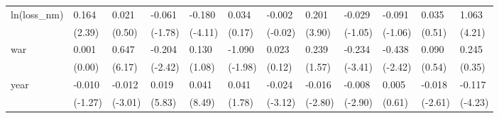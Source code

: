 \begin{tabular}{p{1.5cm} p{2cm} p{1.7cm} p{1.7cm} p{1.7cm} p{1.7cm} p{1.7cm} p{1.7cm} p{1.7cm} p{1.7cm} p{1.7cm} p{1.7cm}}
\hline
ln(loss\_nm)     &    0.164\sym{*}  &    0.021         &   -0.061         &   -0.180\sym{**} &    0.034         &   -0.002         &    0.201\sym{**} &   -0.029         &   -0.091         &    0.035         &    1.063\sym{**} \\
                &   (2.39)         &   (0.50)         &  (-1.78)         &  (-4.11)         &   (0.17)         &  (-0.02)         &   (3.90)         &  (-1.05)         &  (-1.06)         &   (0.51)         &   (4.21)         \\
war             &    0.001         &    0.647\sym{***}&   -0.204\sym{*}  &    0.130         &   -1.090         &    0.023         &    0.239         &   -0.234\sym{**} &   -0.438\sym{*}  &    0.090         &    0.245         \\
                &   (0.00)         &   (6.17)         &  (-2.42)         &   (1.08)         &  (-1.98)         &   (0.12)         &   (1.57)         &  (-3.41)         &  (-2.42)         &   (0.54)         &   (0.35)         \\
year            &   -0.010         &   -0.012\sym{**} &    0.019\sym{***}&    0.041\sym{***}&    0.041         &   -0.024\sym{*}  &   -0.016\sym{*}  &   -0.008\sym{**} &    0.005         &   -0.018\sym{*}  &   -0.117\sym{**} \\
                &  (-1.27)         &  (-3.01)         &   (5.83)         &   (8.49)         &   (1.78)         &  (-3.12)         &  (-2.80)         &  (-2.90)         &   (0.61)         &  (-2.61)         &  (-4.23)         \\
\end{tabular}
